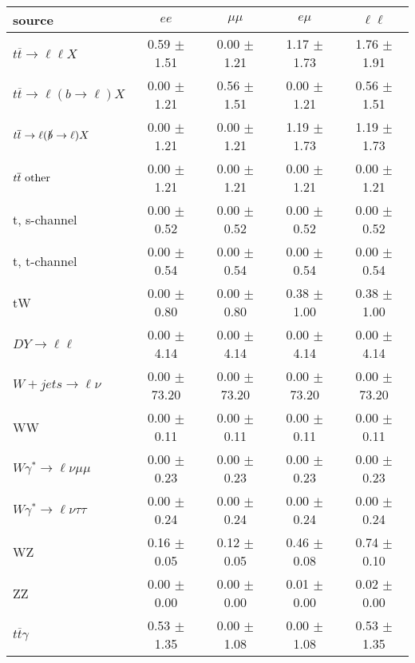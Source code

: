 \begin{tabular}{l|cccc} \hline\hline
source & $ee$ & $\mu\mu$ & $e\mu$ & $\ell\ell $ \\
\hline
$t\overline{t} \rightarrow \ell \ell X$ &  0.59 $\pm$  1.51 &  0.00 $\pm$  1.21 &  1.17 $\pm$  1.73 &  1.76 $\pm$  1.91 \\
$t\overline{t} \rightarrow \ell (b \rightarrow \ell) X$ &  0.00 $\pm$  1.21 &  0.56 $\pm$  1.51 &  0.00 $\pm$  1.21 &  0.56 $\pm$  1.51 \\
$t\overline{t} \rightarrow \ell (\slashed b \rightarrow \ell) X$ &  0.00 $\pm$  1.21 &  0.00 $\pm$  1.21 &  1.19 $\pm$  1.73 &  1.19 $\pm$  1.73 \\
        $t\overline{t}\ \rm{other}$ &  0.00 $\pm$  1.21 &  0.00 $\pm$  1.21 &  0.00 $\pm$  1.21 &  0.00 $\pm$  1.21 \\
\hline
                       t, s-channel &  0.00 $\pm$  0.52 &  0.00 $\pm$  0.52 &  0.00 $\pm$  0.52 &  0.00 $\pm$  0.52 \\
                       t, t-channel &  0.00 $\pm$  0.54 &  0.00 $\pm$  0.54 &  0.00 $\pm$  0.54 &  0.00 $\pm$  0.54 \\
                                 tW &  0.00 $\pm$  0.80 &  0.00 $\pm$  0.80 &  0.38 $\pm$  1.00 &  0.38 $\pm$  1.00 \\
\hline
         $DY \rightarrow \ell \ell$ &  0.00 $\pm$  4.14 &  0.00 $\pm$  4.14 &  0.00 $\pm$  4.14 &  0.00 $\pm$  4.14 \\
      $W+jets \rightarrow \ell \nu$ &  0.00 $\pm$ 73.20 &  0.00 $\pm$ 73.20 &  0.00 $\pm$ 73.20 &  0.00 $\pm$ 73.20 \\
                                 WW &  0.00 $\pm$  0.11 &  0.00 $\pm$  0.11 &  0.00 $\pm$  0.11 &  0.00 $\pm$  0.11 \\
\hline
$W\gamma^{*} \rightarrow \ell \nu \mu\mu$ &  0.00 $\pm$  0.23 &  0.00 $\pm$  0.23 &  0.00 $\pm$  0.23 &  0.00 $\pm$  0.23 \\
$W\gamma^{*} \rightarrow \ell \nu \tau\tau$ &  0.00 $\pm$  0.24 &  0.00 $\pm$  0.24 &  0.00 $\pm$  0.24 &  0.00 $\pm$  0.24 \\
                                 WZ &  0.16 $\pm$  0.05 &  0.12 $\pm$  0.05 &  0.46 $\pm$  0.08 &  0.74 $\pm$  0.10 \\
                                 ZZ &  0.00 $\pm$  0.00 &  0.00 $\pm$  0.00 &  0.01 $\pm$  0.00 &  0.02 $\pm$  0.00 \\
\hline
              $t\overline{t}\gamma$ &  0.53 $\pm$  1.35 &  0.00 $\pm$  1.08 &  0.00 $\pm$  1.08 &  0.53 $\pm$  1.35 \\

\end{tabular}
